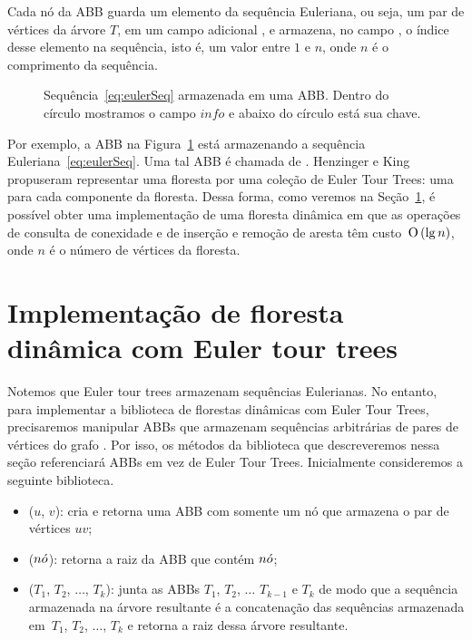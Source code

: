 Cada nó da ABB guarda um elemento da sequência Euleriana, ou seja, um par de vértices da árvore $T$, em um campo adicional , e armazena, no campo , o índice desse elemento na sequência, isto é, um valor entre $1$ e $n$, onde $n$ é o comprimento da sequência.

\begin{figure}[htb]
\centering
\caption{Sequência~\eqref{eq:eulerSeq}  armazenada em uma ABB. Dentro do círculo mostramos o campo $info$ e abaixo do círculo está sua chave.}
\label{fig:seq-treap-indices}
\end{figure}

Por exemplo, a ABB na Figura~\ref{fig:seq-treap-indices} está armazenando a sequência Euleriana~\eqref{eq:eulerSeq}. Uma tal ABB é chamada de . Henzinger e King propuseram representar uma floresta por uma coleção de Euler Tour Trees: uma para cada componente da floresta. Dessa forma, como veremos na Seção~\ref{sec:impleDF-ETT}, é possível obter uma implementação de uma floresta dinâmica em que as operações de consulta de conexidade e de inserção e remoção de aresta têm custo~$\text{O}\left(\lg n\right)$, onde $n$ é o número de vértices da floresta.


\section{Implementação de floresta dinâmica com Euler tour trees}
\label{sec:impleDF-ETT}

Notemos que Euler tour trees armazenam sequências Eulerianas. No entanto, para implementar a biblioteca de florestas dinâmicas com Euler Tour Trees, precisaremos manipular ABBs que armazenam sequências arbitrárias de pares de vértices do grafo . Por isso, os métodos da biblioteca que descreveremos nessa seção referenciará ABBs em vez de Euler Tour Trees. Inicialmente consideremos a seguinte biblioteca.

\begin{itemize}
\item  \treapCreate($u$, $v$): cria e retorna uma ABB com somente um nó que armazena o par de vértices $uv$;
\item \treapGetRoot($n\acute{o}$): retorna a raiz da ABB que contém $n\acute{o}$;
\item \treapJoin($T_1$, $T_2$, $\ldots$, $T_k$): junta as ABBs $T_1$, $T_2$, $\ldots$ $T_{k-1}$ e $T_k$ de modo que a sequência armazenada na árvore resultante é a concatenação das sequências armazenada em~$T_1$, $T_2$, $\ldots$, $T_k$ e retorna a raiz dessa árvore resultante.
\end{itemize}

